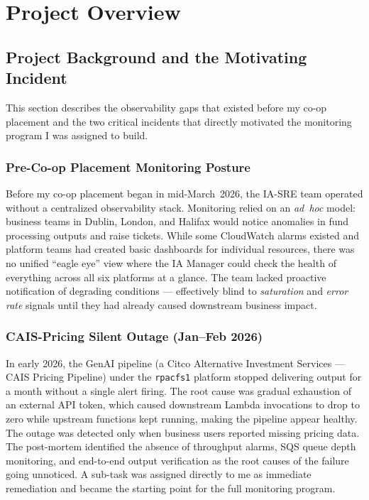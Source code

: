 ﻿%

\chapter{Project Overview}
\label{chap:project}


\FloatBarrier

\section{Project Background and the Motivating Incident}
\label{sec:project_background}

This section describes the observability gaps that existed before my co-op placement and the two critical incidents that directly motivated the monitoring program I was assigned to build.

\subsection{Pre-Co-op Placement Monitoring Posture}

Before my co-op placement began in mid-March~2026, the IA-SRE team operated
without a centralized observability stack. Monitoring relied on
an \emph{ad~hoc} model: business teams in Dublin, London, and Halifax
would notice anomalies in fund processing outputs and raise tickets. While
some CloudWatch alarms existed and platform teams had created basic dashboards
for individual resources, there was no unified ``eagle eye'' view where the
IA Manager could check the health of everything across all six platforms
at a glance. The team lacked proactive notification of degrading conditions
--- effectively blind to \emph{saturation} and \emph{error rate} signals
until they had already caused downstream business impact.

\subsection{CAIS-Pricing Silent Outage (Jan--Feb 2026)}
\label{sec:cais_silent_outage}

In early 2026, the GenAI pipeline (a Citco Alternative Investment Services --- CAIS Pricing Pipeline)
under the \texttt{rpacfs1} platform stopped delivering output for a month without a single alert firing. The root cause
was gradual exhaustion of an external API token, which
caused downstream Lambda invocations to drop to zero while upstream functions kept running, making the pipeline
appear healthy. The outage was detected only when business users reported
missing pricing data. The post-mortem
identified the absence of throughput alarms, SQS queue depth monitoring,
and end-to-end output verification as the root causes of the failure going
unnoticed. A sub-task was assigned directly to me as immediate
remediation and became the starting point for the full monitoring program.

